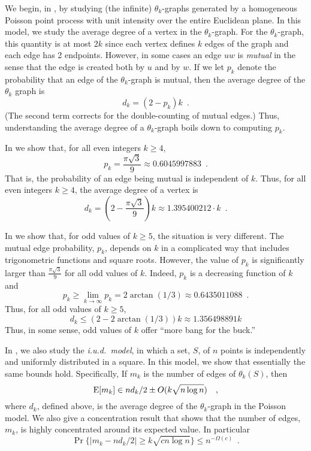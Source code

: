 \documentclass{patmorin}
\begin{document}
We begin, in , by studying (the infinite)
$\theta_k$-graphs generated by a homogeneous Poisson point process
with unit intensity over the entire Euclidean plane.  In this model,
we study the average degree of a vertex in the $\theta_k$-graph.
For the $\theta_k$-graph, this quantity is at most $2k$ since each
vertex defines $k$ edges of the graph and each edge has 2 endpoints.
However, in some cases an edge $uw$ is \emph{mutual} in the sense that
the edge is created both by $u$ and by $w$.  If we let $p_k$ denote the
probability that an edge of the $\theta_k$-graph is mutual, then the
average degree of the $\theta_k$ graph is
\[
    d_k = (2-p_k)k \enspace .
\]
(The second term corrects for the double-counting of mutual edges.)  Thus,
understanding the average degree of a $\theta_k$-graph boils down to
computing $p_k$.

In  we show that, for all even integers $k\ge 4$,
\[
    p_k=\frac{\pi\sqrt{3}}{9}\approx 0.6045997883 \enspace .
\]
That is, the probability of an edge being mutual is independent of
$k$. Thus, for all even integers $k\ge 4$, the average degree of a
vertex is
\[
  d_k = \left(2-\frac{\pi\sqrt{3}}{9}\right)k \approx 1.395400212\cdot k \enspace .
\]

In  we show that, for odd values of $k\ge 5$, the situation
is very different.  The mutual edge probability, $p_k$, depends on
$k$ in a complicated way that includes trigonometric functions and
square roots.  However, the value of $p_k$ is significantly larger than
$\frac{\pi\sqrt{3}}{9}$ for all odd values of $k$.  Indeed, $p_k$ is a
decreasing function of $k$ and
\[
  p_k\ge \lim_{k\to\infty} p_k = 2\arctan(1/3)\approx 0.6435011088 \enspace .
\]
Thus, for all odd values of $k\ge 5$,
\[
   d_k \le (2-2\arctan(1/3))k \approx 1.356498891 k
\]
Thus, in some sense, odd values of $k$ offer ``more bang for the buck.''

In , we also study the \emph{i.u.d.\ model}, in which a
set, $S$, of $n$ points is independently and uniformly distributed in
a square.  In this model, we show that essentially the same bounds hold.
Specifically, If $m_k$ is the number of edges of $\theta_k(S)$, then
\[
    \mathrm{E}[m_k] \in nd_k/2\pm O(k\sqrt{n\log n}) \enspace \enspace ,
\]
where $d_k$, defined above, is the average degree of the $\theta_k$-graph
in the Poisson model.  We also give a concentration result that shows
that the number of edges, $m_k$, is highly concentrated around its
expected value.  In particular
\[
    \Pr\{|m_k - nd_k/2| \ge k\sqrt{cn\log n}\} \le n^{-\Omega(c)} \enspace .
\]
\end{document}
